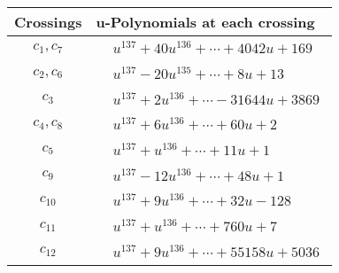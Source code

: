 \documentclass[1p]{elsarticle_modified}
\theoremstyle{definition}
\begin{document}
\begin{tabular}{m{50pt}|m{274pt}}
Crossings & \hspace{64pt}u-Polynomials at each crossing \\
\hline $$\begin{aligned}c_{1},c_{7}\end{aligned}$$&$\begin{aligned}
&u^{137}+40 u^{136}+\cdots+4042 u+169
\end{aligned}$\\
\hline $$\begin{aligned}c_{2},c_{6}\end{aligned}$$&$\begin{aligned}
&u^{137}-20 u^{135}+\cdots+8 u+13
\end{aligned}$\\
\hline $$\begin{aligned}c_{3}\end{aligned}$$&$\begin{aligned}
&u^{137}+2 u^{136}+\cdots-31644 u+3869
\end{aligned}$\\
\hline $$\begin{aligned}c_{4},c_{8}\end{aligned}$$&$\begin{aligned}
&u^{137}+6 u^{136}+\cdots+60 u+2
\end{aligned}$\\
\hline $$\begin{aligned}c_{5}\end{aligned}$$&$\begin{aligned}
&u^{137}+u^{136}+\cdots+11 u+1
\end{aligned}$\\
\hline $$\begin{aligned}c_{9}\end{aligned}$$&$\begin{aligned}
&u^{137}-12 u^{136}+\cdots+48 u+1
\end{aligned}$\\
\hline $$\begin{aligned}c_{10}\end{aligned}$$&$\begin{aligned}
&u^{137}+9 u^{136}+\cdots+32 u-128
\end{aligned}$\\
\hline $$\begin{aligned}c_{11}\end{aligned}$$&$\begin{aligned}
&u^{137}+u^{136}+\cdots+760 u+7
\end{aligned}$\\
\hline $$\begin{aligned}c_{12}\end{aligned}$$&$\begin{aligned}
&u^{137}+9 u^{136}+\cdots+55158 u+5036
\end{aligned}$\\
\hline
\end{tabular}\\~\\
\end{document}

